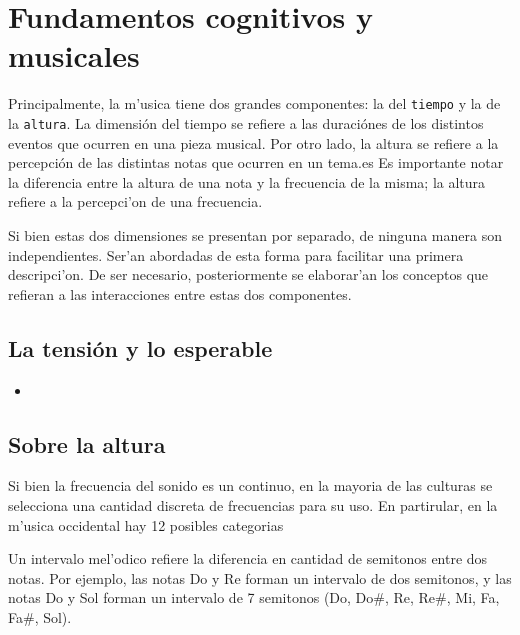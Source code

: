 \section{Fundamentos cognitivos y musicales}
\label{sec_cogn_bg}
Principalmente, la m'usica tiene dos grandes componentes: la del \texttt{tiempo} y la de la 
\texttt{altura}. La dimensi\'on del tiempo se refiere a las duraci\'ones de los distintos eventos que 
ocurren en una pieza musical. Por otro lado, la altura se refiere a la percepci\'on de las distintas notas que ocurren 
en un tema.es Es importante notar la diferencia entre la altura de una nota y la frecuencia de la misma; la altura refiere
a la percepci'on de una frecuencia.

Si bien estas dos dimensiones se presentan por separado, de ninguna manera son independientes. Ser'an abordadas de esta forma 
para facilitar una primera descripci'on. De ser necesario, posteriormente se elaborar'an los conceptos que refieran a las interacciones entre 
estas dos componentes. 

\subsection{La tensi\'on y lo esperable}
\label{subsec_tension}
\begin{itemize}
  \item 

\end{itemize}


\subsection{Sobre la altura}

Si bien la frecuencia del sonido es un continuo, en la mayoria de las culturas se selecciona una cantidad discreta de frecuencias para su uso. 
En partirular, en la m'usica occidental hay 12 posibles categorias

Un intervalo mel'odico refiere la diferencia en cantidad de semitonos entre dos notas. Por ejemplo, las notas Do y Re forman un intervalo de dos semitonos, y las notas 
Do y Sol forman un intervalo de 7 semitonos (Do, Do\#, Re, Re\#, Mi, Fa, Fa\#, Sol). 

